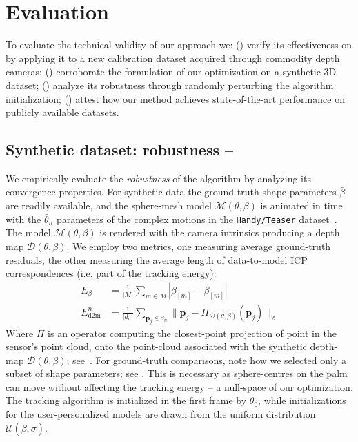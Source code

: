 \section{Evaluation}
To evaluate the technical validity of our approach we:
() verify its effectiveness on by applying it to a new calibration dataset acquired through commodity depth cameras;
() corroborate the formulation of our optimization on a synthetic 3D dataset;
() analyze its robustness through randomly perturbing the algorithm initialization; 
() attest how our method achieves state-of-the-art performance on publicly available datasets.


\subsection{Synthetic dataset: robustness -- }
\label{sec:evalsynth}
We empirically evaluate the \emph{robustness} of the algorithm by analyzing its convergence properties. 
For synthetic data the ground truth shape parameters $\bar\beta$ are readily available, and the sphere-mesh model $\mathcal{M}(\theta,\beta)$ is animated in time with the $\bar\theta_n$ parameters of the complex motions in the \texttt{Handy/Teaser} dataset~\cite{tkach2016sphere}.
The model $\mathcal{M}(\theta,\beta)$ is rendered with the camera intrinsics producing a depth map $\mathcal{D}(\theta,\beta)$. We employ two metrics, one measuring average ground-truth residuals, the other measuring the average length of data-to-model ICP correspondences (i.e. part of the tracking energy):
% 
\begin{align}
E_{\beta} &= \tfrac{1}{|M|} \sum_{m \in M} \left| \beta_{[m]} - \bar\beta_{[m]} \right|
\\
E_\text{d2m}^n &= \tfrac{1}{|d_n|} \sum_{\mathbf{p}_j \in d_n} \| \mathbf{p}_j - \Pi_{\mathcal{D}(\theta,\beta)}(\mathbf{p}_j) \|_2
\label{eq:metrics}
\end{align}
% 
Where $\Pi$ is an operator computing the closest-point projection of point in the sensor's point cloud, onto the point-cloud associated with the synthetic depth-map $\mathcal{D}(\theta,\beta)$; see~\cite{tkach2016sphere}. For ground-truth comparisons, note how we selected only a subset  of shape parameters; see . This is necessary as sphere-centres on the palm can move without affecting the tracking energy -- a null-space of our optimization.
% 
The tracking algorithm is initialized in the first frame by $\bar\theta_0$, while initializations for the user-personalized models are drawn from the uniform distribution {\small $\mathcal{U}(\bar\beta, \sigma)$}.
